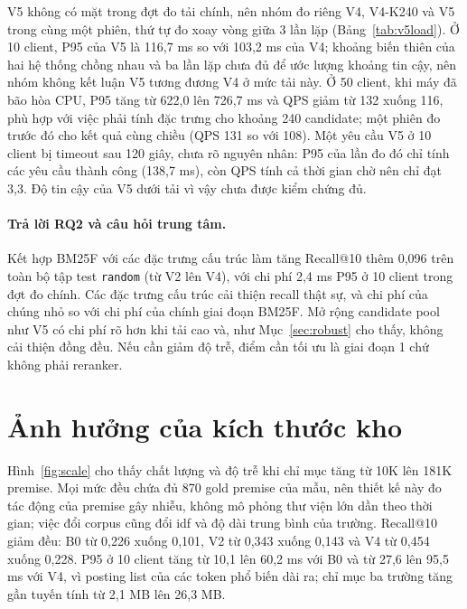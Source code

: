\documentclass[11pt,a4paper,oneside]{report}
\newcommand{\code}[1]{\texttt{#1}}
\begin{document}
\FloatBarrier
{}


V5 không có mặt trong đợt đo tải chính, nên nhóm đo riêng V4, V4-K240 và V5 trong cùng một phiên, thứ tự đo xoay vòng giữa 3
lần lặp (Bảng~\ref{tab:v5load}). Ở 10 client, P95 của V5 là 116,7 ms so với 103,2 ms của V4; khoảng biến thiên của hai hệ
thống chồng nhau và ba lần lặp chưa đủ để ước lượng khoảng tin cậy, nên nhóm không kết luận V5 tương đương V4 ở mức tải này.
Ở 50 client, khi máy đã bão hòa CPU, P95 tăng từ 622,0 lên 726,7 ms và QPS giảm từ 132 xuống 116, phù hợp với việc phải tính
đặc trưng cho khoảng 240 candidate; một phiên đo trước đó cho kết quả cùng chiều (QPS 131 so với 108). Một yêu cầu V5 ở 10
client bị timeout sau 120 giây, chưa rõ nguyên nhân: P95 của lần đo đó chỉ tính các yêu cầu thành công (138,7 ms), còn QPS
tính cả thời gian chờ nên chỉ đạt 3,3. Độ tin cậy của V5 dưới tải vì vậy chưa được kiểm chứng đủ.

\paragraph{Trả lời RQ2 và câu hỏi trung tâm.} Kết hợp BM25F với các đặc trưng cấu trúc làm tăng Recall@10 thêm 0,096 trên
toàn bộ tập test \code{random} (từ V2 lên V4), với chi phí 2,4 ms P95 ở 10 client trong đợt đo chính. Các đặc trưng cấu trúc
cải thiện recall thật sự, và chi phí của chúng nhỏ so với chi phí của chính giai đoạn BM25F. Mở rộng candidate pool như V5
có chi phí rõ hơn khi tải cao và, như Mục~\ref{sec:robust} cho thấy, không cải thiện đồng đều. Nếu cần giảm độ trễ, điểm cần
tối ưu là giai đoạn 1 chứ không phải reranker.

\section{Ảnh hưởng của kích thước kho}

Hình~\ref{fig:scale} cho thấy chất lượng và độ trễ khi chỉ mục tăng từ 10K lên 181K premise. Mọi mức đều chứa đủ 870
gold premise của mẫu, nên thiết kế này đo tác động của premise gây nhiễu, không mô phỏng thư viện lớn dần theo thời gian;
việc đổi corpus cũng đổi idf và độ dài trung bình của trường. Recall@10 giảm đều: B0 từ 0,226 xuống 0,101, V2 từ 0,343
xuống 0,143 và V4 từ 0,454 xuống 0,228. P95 ở 10 client tăng từ 10,1 lên 60,2 ms với B0 và từ 27,6 lên 95,5 ms với V4, vì
posting list của các token phổ biến dài ra; chỉ mục ba trường tăng gần tuyến tính từ 2,1 MB lên 26,3 MB.
\end{document}
